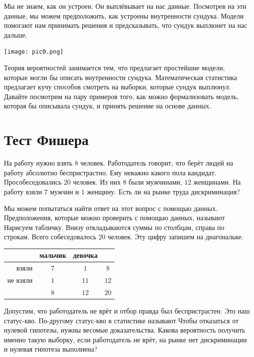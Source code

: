 \documentclass[12pt, a4paper, oneside]{article}
\begin{document}
 Мы не знаем, как он устроен. Он выплёвывает на нас данные. Посмотрев на эти данные, мы можем предположить, как устроены внутренности сундука.  Модели помогают нам принимать решения и предсказывать, что сундук выплюнет на нас дальше.

\begin{center} 
\texttt{[image: pic0.png]}
\end{center} 

Теория вероятностей занимается тем, что предлагает простейшие модели, которые могли бы описать внутренности сундука. Математическая статистика предлагает кучу способов смотреть на выборки, которые сундук выплюнул. Давайте посмотрим на пару примеров того, как можно формализовать модель, которая бы описывала сундук, и принять решение на основе данных.

\section{Тест Фишера}

На работу нужно взять $8$ человек. Работодатель говорит, что берёт людей на работу абсолютно беспристрастно. Ему неважно какого пола кандидат. Прособеседовались $20$ человек. Из них $8$ были мужчинами, $12$ женщинами. На работу взяли $7$ мужчин и $1$ женщину. Есть ли на рынке труда дискриминация?  

Мы можем попытаться найти ответ на этот вопрос с помощью данных. Предположения, которые можно проверить с помощью данных, называют  Нарисуем табличку. Внизу откладываются суммы по столбцам, справа по строкам. Всего собеседовалось $20$ человек. Эту цифру запишем на диагональке. 

\begin{center}
    \begin{tabular}{|r|c|c|c|}
    \hline
                  & мальчик & девочка &        \\ \hline 
         взяли    &   $7$   &   $1$   & $8$    \\ \hline 
         не взяли &   $1$   &   $11$  & $12$   \\ \hline 
                  &   $8$   &   $12$  & $20$   \\ \hline
    \end{tabular}
\end{center}

Допустим, что работодатель не врёт и отбор правда был беспристрастен. Это наш статус-кво. По-другому статус-кво в статистике называют  Чтобы отказаться от нулевой гипотезы, нужны весомые доказательства. Какова вероятность получить именно такую выборку, если работодатель не врёт, на рынке нет дискриминации и нулевая гипотеза выполнена?
\end{document}

